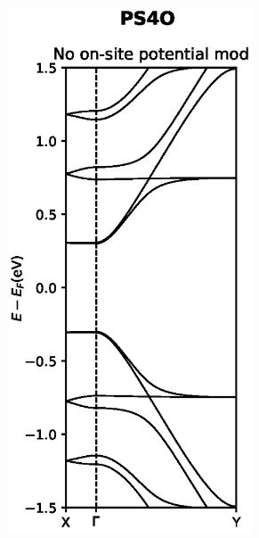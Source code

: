 \begin{figure}[h]
	\hspace{20pt}
	\begin{subfigure}[b]{0.3\textwidth}
		\centering
		\includegraphics[width=0.8\textwidth]{Figures/PS4Onomod.eps}
		\vspace{-2\baselineskip}
		\caption{}
		\label{PS4Odevnomod}
	\end{subfigure}
	~
	\begin{subfigure}[b]{0.3\textwidth}
		\centering

\end{subfigure}
\end{figure}
